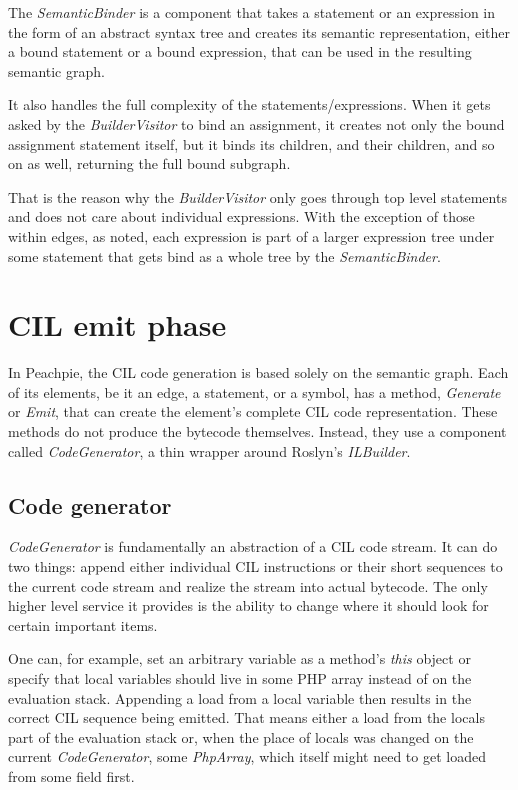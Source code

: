 The \emph{SemanticBinder} is a component that takes a statement or an expression in the form of an abstract syntax tree and creates its semantic representation, either a bound statement or a bound expression, that can be used in the resulting semantic graph. 

It also handles the full complexity of the statements/expressions. When it gets asked by the \emph{BuilderVisitor} to bind an assignment, it creates not only the bound assignment statement itself, but it binds its children, and their children, and so on as well, returning the full bound subgraph. 

That is the reason why the \emph{BuilderVisitor} only goes through top level statements and does not care about individual expressions. With the exception of those within edges, as noted, each expression is part of a larger expression tree under some statement that gets bind as a whole tree by the \emph{SemanticBinder}. 

\section{CIL emit phase}

In Peachpie, the CIL code generation is based solely on the semantic graph. Each of its elements, be it an edge, a statement, or a symbol, has a method, \emph{Generate} or \emph{Emit}, that can create the element’s complete CIL code representation. These methods do not produce the bytecode themselves. Instead, they use a component called \emph{CodeGenerator}, a thin wrapper around Roslyn’s \emph{ILBuilder}.


\subsection{Code generator}
\emph{CodeGenerator} is fundamentally an abstraction of a CIL code stream. It can do two things: append either individual CIL instructions or their short sequences to the current code stream and realize the stream into actual bytecode. The only higher level service it provides is the ability to change where it should look for certain important items.

One can, for example, set an arbitrary variable as a method's \emph{this} object or specify that local variables should live in some PHP array instead of on the evaluation stack. Appending a load from a local variable then results in the correct CIL sequence being emitted. That means either a load from the locals part of the evaluation stack or, when the place of locals was changed on the current \emph{CodeGenerator}, some \emph{PhpArray}, which itself might need to get loaded from some field first. 

